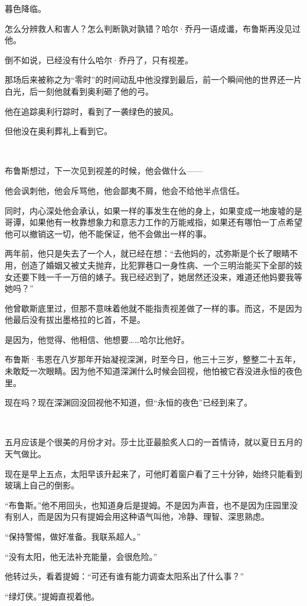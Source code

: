 \documentclass[../main]{subfiles}
\begin{document}
暮色降临。

怎么分辨救人和害人？怎么判断孰对孰错？哈尔·乔丹一语成谶，布鲁斯再没见过他。

倒不如说，已经没有什么哈尔·乔丹了，只有视差。

那场后来被称之为“零时”的时间动乱中他没撑到最后，前一个瞬间他的世界还一片白光，后一刻他就看到奥利砸了他的弓。

他在追踪奥利行踪时，看到了一袭绿色的披风。

但他没在奥利葬礼上看到它。

~\

布鲁斯想过，下一次见到视差的时候，他会做什么——

他会讽刺他，他会斥骂他，他会鄙夷不屑，他会不给他半点信任。

同时，内心深处他会承认，如果一样的事发生在他的身上，如果变成一地废墟的是哥谭，如果他有一枚靠想象力和意志力工作的万能戒指，如果还有哪怕一丁点希望他可以撤销这一切，他不能保证，他不会做出一样的事。

两年前，他只是失去了一个人，就已经在想：“去他妈的，忒弥斯是个长了眼睛不用，创造了婚姻又被丈夫抛弃，比犯罪巷口一身性病、一个三明治能买下全部的妓女还要下贱一千一万倍的婊子。我已经迟到了，她居然还没来，难道还他妈要我等她吗？”

他曾歇斯底里过，但那不意味着他就不能指责视差做了一样的事。而这，不是因为他最后没有拔出墨格拉的匕首，不是。

是因为，他觉得、他相信、他想要……哈尔比他好。

布鲁斯·韦恩在八岁那年开始凝视深渊，时至今日，他三十三岁，整整二十五年，未敢眨一次眼睛。因为他不知道深渊什么时候会回视，他怕被它吞没进永恒的夜色里。

现在吗？现在深渊回没回视他不知道，但“永恒的夜色”已经到来了。

~\

五月应该是个很美的月份才对。莎士比亚最脍炙人口的一首情诗，就以夏日五月的天气做比。

现在是早上五点，太阳早该升起来了，可他盯着窗户看了三十分钟，始终只能看到玻璃上自己的倒影。

“布鲁斯。”他不用回头，也知道身后是提姆。不是因为声音，也不是因为庄园里没有别人，而是因为只有提姆会用这种语气叫他，冷静、理智、深思熟虑。

“保持警惕，做好准备。我联系超人。”

“没有太阳，他无法补充能量，会很危险。”

他转过头，看着提姆：“可还有谁有能力调查太阳系出了什么事？”

“绿灯侠。”提姆直视着他。
\end{document}
